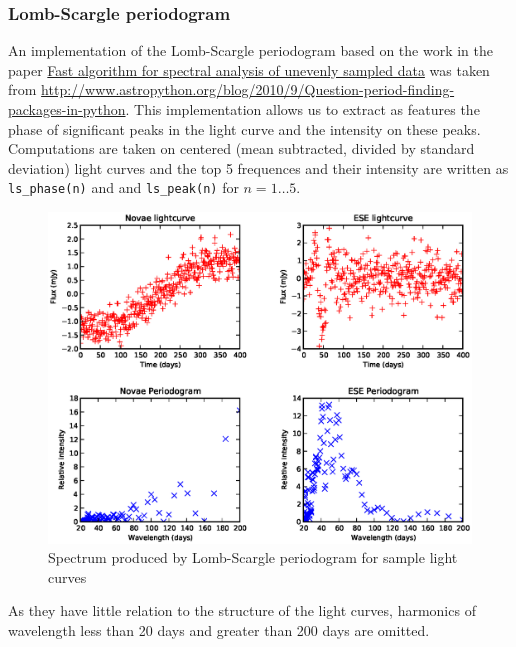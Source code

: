 \documentclass[10pt]{report}
\begin{document}
	\subsubsection{Lomb-Scargle periodogram}
	An implementation of the Lomb-Scargle periodogram based on the work in the paper \href{http://adsabs.harvard.edu/abs/1989ApJ...338..277P}{Fast algorithm for spectral analysis of unevenly sampled data} was taken from \url{http://www.astropython.org/blog/2010/9/Question-period-finding-packages-in-python}. This implementation allows us to extract as features the phase of significant peaks in the light curve and the intensity on these peaks. Computations are taken on centered (mean subtracted, divided by standard deviation) light curves and the top 5 frequences and their intensity are written as \verb#ls_phase(n)# and and \verb#ls_peak(n)# for $n = 1\ldots 5$. \\ %
	\begin{figure}[ht!]
		\label{fig:lsspectrum}
		\includegraphics[width=\textwidth]{figures/lomb_demo.eps}
		\caption{Spectrum produced by Lomb-Scargle periodogram for sample light curves}
	\end{figure}
	
	As they have little relation to the structure of the light curves, harmonics of wavelength less than 20 days and greater than 200 days are omitted.
	

	
		
\end{document}
